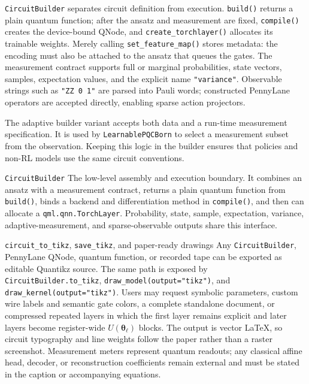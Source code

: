 \documentclass[10pt]{article}
\newcommand{\code}[1]{\texttt{#1}}
\begin{document}
\code{CircuitBuilder} separates circuit definition from execution.
\code{build()} returns a plain quantum function; after the ansatz and
measurement are fixed, \code{compile()} creates the device-bound QNode, and
\code{create\_torchlayer()} allocates its trainable weights.  Merely calling
\code{set\_feature\_map()} stores metadata: the encoding must also be attached
to the ansatz that queues the gates.  The measurement contract supports full
or marginal probabilities, state vectors, samples, expectation values, and the
explicit name \code{"variance"}.  Observable strings such as
\code{"ZZ 0 1"} are parsed into Pauli words; constructed PennyLane operators
are accepted directly, enabling sparse action projectors.

The adaptive builder variant accepts both data and a run-time measurement specification.  It is used by \code{LearnablePQCBorn} to select a measurement subset from the observation.  Keeping this logic in the builder ensures that policies and non-RL models use the same circuit conventions.

\begin{qaspfeature}{\code{CircuitBuilder}}
The low-level assembly and execution boundary.  It combines an ansatz with a
measurement contract, returns a plain quantum function from \code{build()},
binds a backend and differentiation method in \code{compile()}, and then can
allocate a \code{qml.qnn.TorchLayer}.
Probability, state, sample, expectation, variance, adaptive-measurement, and
sparse-observable outputs share this interface.
\end{qaspfeature}

\begin{qaspfeature}{\code{circuit\_to\_tikz}, \code{save\_tikz}, and paper-ready drawings}
Any \code{CircuitBuilder}, PennyLane QNode, quantum function, or recorded tape
can be exported as editable Quantikz source.  The same path is exposed by
\code{CircuitBuilder.to\_tikz}, \code{draw\_model(output="tikz")}, and
\code{draw\_kernel(output="tikz")}.  Users may request symbolic parameters,
custom wire labels and semantic gate colors, a complete standalone document,
or compressed repeated layers in which the first layer remains explicit and
later layers become register-wide $U(\bm\theta_\ell)$ blocks.  The output is
vector LaTeX, so circuit typography and line weights follow the paper rather
than a raster screenshot.  Measurement meters represent quantum readouts; any
classical affine head, decoder, or reconstruction coefficients remain external
and must be stated in the caption or accompanying equations.
\end{qaspfeature}
\end{document}
